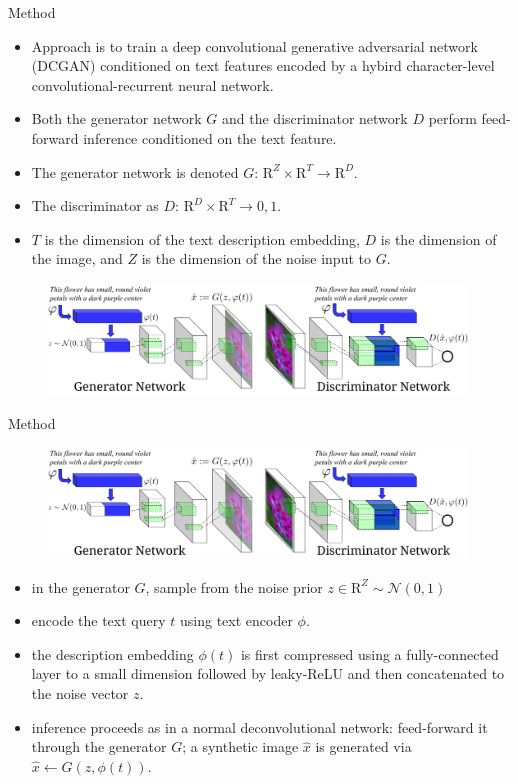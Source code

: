 \documentclass[10pt]{beamer}
\begin{document}
	\begin{frame}{Method}
		\begin{itemize}
			\item Approach is to train a deep convolutional generative adversarial network (DCGAN) conditioned on text features encoded by a hybird character-level convolutional-recurrent neural network.
			\onslide<2->
			\item Both the generator network $G$ and the discriminator network $D$ perform feed-forward inference conditioned on the text feature.
			\onslide<3->
			\item The generator network is denoted $G$: $\mathrm{R}^Z\times\mathrm{R}^T\rightarrow\mathrm{R}^D$.
			\onslide<4->
			\item The discriminator as $D$: $\mathrm{R}^D\times\mathrm{R}^T\rightarrow{0,1}$.
			\onslide<5->
			\item $T$ is the dimension of the text description embedding, $D$ is the dimension of the image, and $Z$ is the dimension of the noise input to $G$.
		\end{itemize}
		\begin{figure}
			\includegraphics<6->[width=30em]{figures/image-synthesis-structure.png}
		\end{figure}
	\end{frame}

	\begin{frame}[t]{Method}
		\begin{figure}
			\includegraphics[width=30em]{figures/image-synthesis-structure.png}
		\end{figure}
		\begin{itemize}
			\pause
			\item in the generator $G$, sample from the noise prior $z\in\mathrm{R}^Z\sim\mathcal{N}(0,1)$
			\pause
			\item encode the text query $t$ using text encoder $\phi$.
			\pause
			\item the description embedding $\phi(t)$ is first compressed using a fully-connected layer to a small dimension followed by leaky-ReLU and then concatenated to the noise vector $z$.
			\pause
			\item inference proceeds as in a normal deconvolutional network: feed-forward it through the generator $G$; a synthetic image $\hat{x}$ is generated via $\hat{x}\leftarrow G(z,\phi(t))$.
		\end{itemize} 
	\end{frame}
\end{document}
